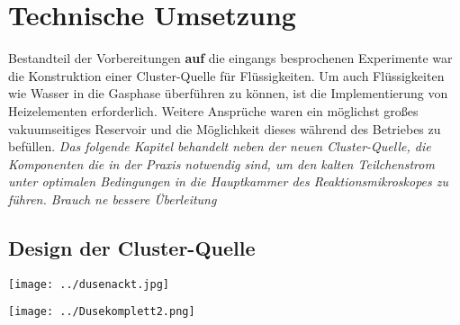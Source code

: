 \chapter{Technische Umsetzung} 

Bestandteil der Vorbereitungen \textbf{auf} die eingangs besprochenen Experimente war die Konstruktion einer Cluster-Quelle für Flüssigkeiten. Um auch Flüssigkeiten wie Wasser in die Gasphase überführen zu können, ist die Implementierung von Heizelementen erforderlich. Weitere Ansprüche waren ein möglichst großes vakuumseitiges Reservoir und die Möglichkeit dieses während des Betriebes zu befüllen. \textit{Das folgende Kapitel behandelt neben der neuen Cluster-Quelle, die Komponenten die in der Praxis notwendig sind, um den kalten Teilchenstrom unter optimalen Bedingungen in die Hauptkammer des Reaktionsmikroskopes zu führen. Brauch ne bessere Überleitung}

\section{Design der Cluster-Quelle} \label{sec:Quelle}

\begin{center}
\begin{minipage}{1\linewidth}
\centering
\texttt{[image: ../dusenackt.jpg]}%
 \label{fig:dusenackt}
\end{minipage} 
\end{center} 

\begin{center}
\begin{minipage}{\linewidth}
\centering
\texttt{[image: ../Dusekomplett2.png]}%
 \label{fig:QuerschnittDuse}
\end{minipage} 
\end{center} 

